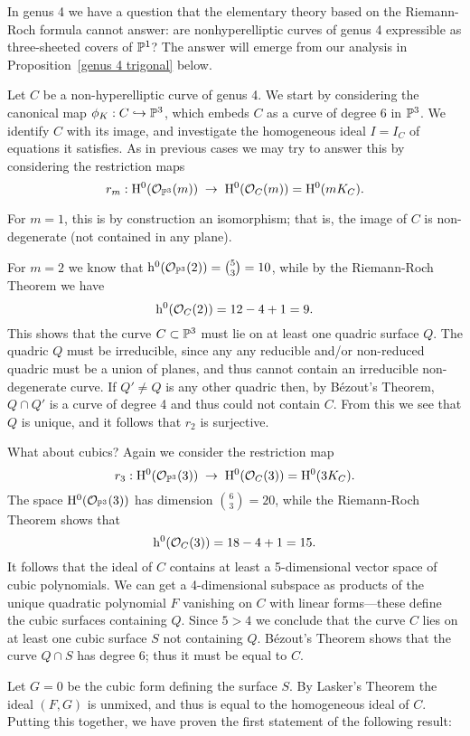 In genus 4 we have a question that the elementary theory based on the Riemann-Roch formula cannot answer: are nonhyperelliptic curves of genus 4 expressible as three-sheeted covers of $\PP^1$? The answer will emerge from our analysis in Proposition~\ref{genus 4 trigonal} below.

Let $C$ be a non-hyperelliptic curve of genus 4. We start by considering the canonical map $\phi_K : C \hookrightarrow \PP^3$, which embeds $C$ as a curve of degree 6 in $\PP^3$. We identify $C$ with its image, and investigate the homogeneous ideal $I = I_C$ of equations it satisfies. As in previous cases we may try to answer this by considering the restriction maps
$$
r_m : \HH^0(\cO_{\PP^3}(m)) \; \to \; \HH^0(\cO_{C}(m)) = \HH^0(mK_C).
$$

For $m=1$, this is by construction an isomorphism; that is, the image of $C$ is non-degenerate (not contained in any plane).

For $m=2$ we know that $\h^0(\cO_{\PP^3}(2)) = \binom{5}{3} = 10$, while by the Riemann-Roch
Theorem we have
$$
\h^0(\cO_C(2)) = 12 - 4 + 1 = 9.
$$
This shows that the curve $C \subset \PP^3$ must lie on at least one quadric surface $Q$. The quadric $Q$ must be irreducible, since any any reducible and/or non-reduced quadric must be a union of planes, and thus cannot contain an irreducible non-degenerate curve.
If $Q'\neq Q$ is any other quadric then, by B\'ezout's Theorem, $Q\cap Q'$ is a curve of degree 4 and thus could not contain $C$. From this we see that $Q$ is unique, and it follows that $r_2$ is surjective.

What about cubics? Again we consider the restriction map
$$
r_3 : \HH^0(\cO_{\PP^3}(3)) \; \to \; \HH^0(\cO_{C}(3)) = \HH^0(3K_C).
$$
The space $\HH^0(\cO_{\PP^3}(3))$ has dimension $\binom{6}{3} = 20$, while  the Riemann-Roch Theorem shows that
$$
\h^0(\cO_C(3)) = 18 - 4 + 1 = 15.
$$
It follows that the ideal of $C$ contains at least a 5-dimensional vector space of cubic polynomials. We can get a 4-dimensional subspace as products of the unique quadratic polynomial $F$ vanishing on $C$ with linear forms---these define the cubic surfaces containing $Q$. Since $5 > 4$ we  conclude that the curve $C$ lies on at least one cubic surface $S$  not containing $Q$. 
B\'ezout's Theorem shows that the curve $Q \cap S$ has degree 6; thus it must be equal to $C$. 

Let $G=0$ be the cubic form defining the surface $S$. By Lasker's Theorem the ideal $(F,G)$ is unmixed, and thus is equal to the homogeneous ideal of $C$. Putting this together, we have proven the first statement of the following result:

